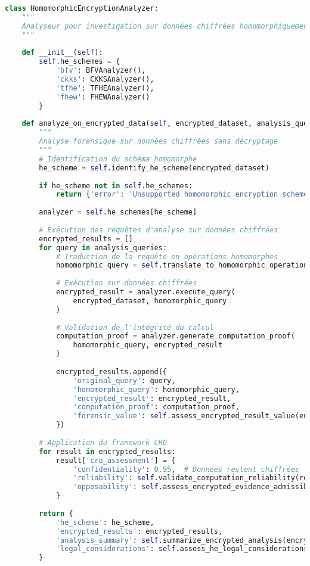 \begin{lstlisting}[language=Python, caption=Analyseur de chiffrement homomorphe]
class HomomorphicEncryptionAnalyzer:
    """
    Analyseur pour investigation sur données chiffrées homomorphiquement
    """
    
    def __init__(self):
        self.he_schemes = {
            'bfv': BFVAnalyzer(),
            'ckks': CKKSAnalyzer(),
            'tfhe': TFHEAnalyzer(),
            'fhew': FHEWAnalyzer()
        }
        
    def analyze_on_encrypted_data(self, encrypted_dataset, analysis_queries):
        """
        Analyse forensique sur données chiffrées sans décryptage
        """
        # Identification du schéma homomorphe
        he_scheme = self.identify_he_scheme(encrypted_dataset)
        
        if he_scheme not in self.he_schemes:
            return {'error': 'Unsupported homomorphic encryption scheme'}
            
        analyzer = self.he_schemes[he_scheme]
        
        # Exécution des requêtes d'analyse sur données chiffrées
        encrypted_results = []
        for query in analysis_queries:
            # Traduction de la requête en opérations homomorphes
            homomorphic_query = self.translate_to_homomorphic_operations(query)
            
            # Exécution sur données chiffrées
            encrypted_result = analyzer.execute_query(
                encrypted_dataset, homomorphic_query
            )
            
            # Validation de l'intégrité du calcul
            computation_proof = analyzer.generate_computation_proof(
                homomorphic_query, encrypted_result
            )
            
            encrypted_results.append({
                'original_query': query,
                'homomorphic_query': homomorphic_query,
                'encrypted_result': encrypted_result,
                'computation_proof': computation_proof,
                'forensic_value': self.assess_encrypted_result_value(encrypted_result)
            })
            
        # Application du framework CRO
        for result in encrypted_results:
            result['cro_assessment'] = {
                'confidentiality': 0.95,  # Données restent chiffrées
                'reliability': self.validate_computation_reliability(result),
                'opposability': self.assess_encrypted_evidence_admissibility(result)
            }
            
        return {
            'he_scheme': he_scheme,
            'encrypted_results': encrypted_results,
            'analysis_summary': self.summarize_encrypted_analysis(encrypted_results),
            'legal_considerations': self.assess_he_legal_considerations(he_scheme)
        }
\end{lstlisting}


